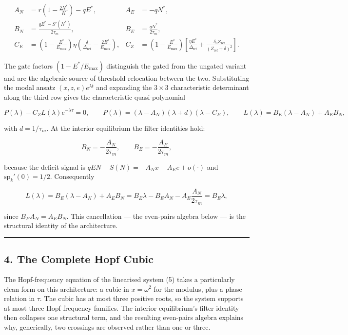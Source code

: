 \documentclass[11pt]{article}
\begin{document}
\[\begin{aligned}
A_N &= r\left(1 - \frac{2N^*}{K}\right) - qE^*, & A_E &= -qN^*, \\
B_N &= \frac{qE^* - S'(N^*)}{2\tau_m}, & B_E &= \frac{qN^*}{2\tau_m}, \\
C_E &= \left(1 - \frac{E^*}{E_{\max}}\right)\eta\left(\frac{\delta}{\Delta_{\mathrm{ref}}} - \frac{2E^*}{E_{\max}}\right), & C_Z &= \left(1 - \frac{E^*}{E_{\max}}\right)\left[\frac{\eta E^*}{\Delta_{\mathrm{ref}}} + \frac{\delta_0 Z_{\mathrm{ref}}}{(Z_{\mathrm{ref}} + \delta)^2}\right].
\end{aligned}\]

The gate factors \((1 - E^*/E_{\max})\) distinguish the gated from the
ungated variant and are the algebraic source of threshold relocation
between the two. Substituting the modal ansatz \((x,z,e)e^{\lambda t}\)
and expanding the \(3 \times 3\) characteristic determinant along the
third row gives the characteristic quasi-polynomial

\[P(\lambda) - C_Z L(\lambda) e^{-\lambda\tau} = 0, \qquad P(\lambda) = (\lambda - A_N)(\lambda + d)(\lambda - C_E), \qquad L(\lambda) = B_E(\lambda - A_N) + A_E B_N, \tag{5}\]

with \(d = 1/\tau_m\). At the interior equilibrium the filter identities
hold:

\[B_N = -\frac{A_N}{2\tau_m}, \qquad B_E = -\frac{A_E}{2\tau_m},\]

because the deficit signal is \(qEN - S(N) = -A_N x - A_E e + o(\cdot)\)
and \(\mathrm{sp}_k'(0) = 1/2\). Consequently

\[L(\lambda) = B_E(\lambda - A_N) + A_E B_N = B_E\lambda - B_E A_N - A_E \frac{A_N}{2\tau_m} = B_E\lambda,\]

since \(B_E A_N = A_E B_N\). This cancellation --- the even-pairs
algebra below --- is the structural identity of the architecture.

\begin{center}\rule{0.5\linewidth}{0.5pt}\end{center}

\subsection{4. The Complete Hopf Cubic}\label{the-complete-hopf-cubic}

The Hopf-frequency equation of the linearised system (5) takes a
particularly clean form on this architecture: a cubic in
\(x = \omega^2\) for the modulus, plus a phase relation in \(\tau\). The
cubic has at most three positive roots, so the system supports at most
three Hopf-frequency families. The interior equilibrium's filter
identity then collapses one structural term, and the resulting
even-pairs algebra explains why, generically, two crossings are observed
rather than one or three.
\end{document}
